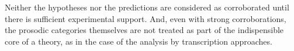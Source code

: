 Neither the hypotheses nor the predictions are considered as corroborated until there is sufficient experimental support. And, even with strong corroborations, the prosodic categories themselves are not treated as part of the indispensible core of a theory, as in the case of the analysis by transcription approaches.


%
%
%
%
%

